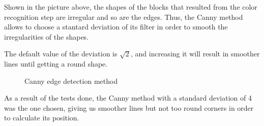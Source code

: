 Shown in the picture above, the shapes of the blocks that resulted from the color recognition step are irregular and so are the edges. Thus, the Canny method allows to choose a stantard deviation of its filter in order to smooth the irregularities of the shapes.\par 



The default value of the deviation is $\sqrt{2}$, and increasing it will result in smoother lines until getting a round shape.

\begin{figure}[H]
\hfill
{}
\hfill
{}
\hfill
{}
\hfill
{}
\hfill

\caption{Canny edge detection method}

\end{figure}

As a result of the tests done, the Canny method with a standard deviation of 4 was the one chosen, giving us smoother lines but not too round corners in order to calculate its position.



 